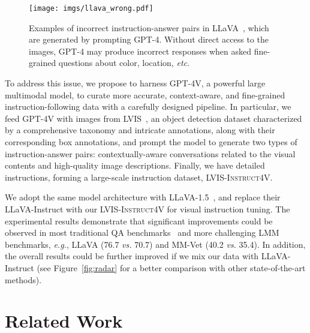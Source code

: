 \documentclass{article}
\makeatletter
\newcommand{\dataname}{\textsc{LVIS-Instruct4V}\xspace}
\newcommand*{\eg}{\emph{e.g.}\@\xspace}
\newcommand*{\etc}{\emph{etc}\@\xspace}
\newcommand*{\vs}{\emph{vs.}\@\xspace}
\makeatother
\begin{document}
\begin{figure}[t]
  \centering
  \texttt{[image: imgs/llava\_wrong.pdf]}
\caption{Examples of incorrect instruction-answer pairs in LLaVA~\cite{li2023llava}, which are generated by prompting GPT-4. Without direct access to the images, GPT-4 may produce incorrect responses when asked fine-grained questions about color, location, \etc. }
  \label{fig:llava_wrong}
\end{figure}


To address this issue, we propose to harness GPT-4V, a powerful large multimodal model, to curate more accurate, context-aware, and fine-grained instruction-following data with a carefully designed pipeline. In particular, we feed GPT-4V with images from LVIS~\cite{gupta2019lvis}, an object detection dataset characterized by a comprehensive taxonomy and intricate annotations, along with their corresponding box annotations, and prompt the model to generate two types of instruction-answer pairs: contextually-aware conversations related to the visual contents and high-quality image descriptions. Finally, we have  detailed instructions, forming a large-scale instruction dataset, \dataname. 

We adopt the same model architecture with LLaVA-1.5~\cite{liu2023improved}, and replace their LLaVA-Instruct with our \dataname for visual instruction tuning. The experimental results demonstrate that significant improvements could be observed in most traditional QA benchmarks~\cite{goyal2017vqav2,gurari2018vizwiz} and more challenging LMM benchmarks, \eg, LLaVA (76.7 \vs 70.7) and MM-Vet (40.2 \vs 35.4). In addition, the overall results could be further improved if we mix our data with LLaVA-Instruct (see Figure~\ref{fig:radar} for a better comparison with other state-of-the-art methods).

 \section{Related Work}
\label{sec:related}
\end{document}
